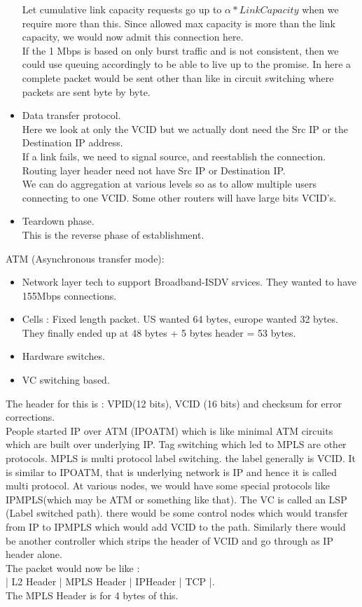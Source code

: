 \documentclass[solution,addpoints,12pt]{exam}
\begin{document}
\begin{itemize}
Let cumulative link capacity requests go up to $\alpha*LinkCapacity$ when
we require more than this. Since allowed max capacity is more than
the link capacity, we would now admit this connection here.\\
If the 1 Mbps is based on only burst traffic and is not
consistent, then we could use queuing accordingly to be able to
live up to the promise. In here a complete packet would be sent other than like
in circuit switching where packets are sent byte by byte.\\

\item Data transfer protocol.\\

Here we look at only the VCID but we actually dont need the
Src IP or the Destination IP address.\\
If a link fails, we need to signal source, and reestablish the
connection. Routing layer header need not have Src IP or Destination IP.\\
We can do aggregation at various levels so as to allow multiple
users connecting to one VCID. Some other routers will have large
bits VCID's.

\item Teardown phase.\\
This is the reverse phase of establishment.
\end{itemize}
ATM (Asynchronous transfer mode):\\
\begin{itemize}
\item Network layer tech to support Broadband-ISDV srvices. They wanted
to have 155Mbps connections.
\item Cells : Fixed length packet. US wanted 64 bytes, europe wanted 32 bytes.
They finally ended up at 48 bytes + 5 bytes header = 53 bytes.
\item Hardware switches.
\item VC switching based.
\end{itemize}
The header for this is : VPID(12 bits), VCID (16 bits) and
checksum for error corrections.\\
People started IP over ATM (IPOATM) which is like minimal ATM circuits
which are built over underlying IP. Tag switching which led to MPLS
are other protocols. MPLS is multi protocol label switching.
the label generally is VCID. It is similar to IPOATM, that is
underlying network is IP and hence it is called multi protocol. At
various nodes, we would have some special protocols
like IPMPLS(which may be ATM or something like that). The VC is
called an LSP (Label switched path). there would be some control nodes
which would transfer from IP to IPMPLS which would
add VCID to the path. Similarly there would
be another controller which strips the header
of VCID and go through as IP header alone.\\
The packet would now be like :\\
| L2 Header | MPLS Header | IPHeader | TCP |.\\
The MPLS Header is for 4 bytes of this.\\
\end{document}
